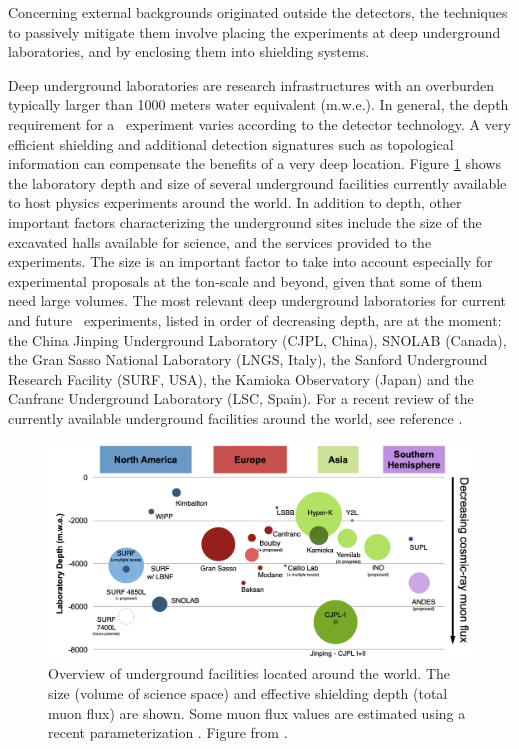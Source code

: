 Concerning external backgrounds originated outside the detectors, the techniques to passively mitigate them involve placing the experiments at deep underground laboratories, and by enclosing them into shielding systems. 

Deep underground laboratories are research infrastructures with an overburden typically larger than 1000 meters water equivalent (m.w.e.). In general, the depth requirement for a \bbonu\ experiment varies according to the detector technology. A very efficient shielding and additional detection signatures such as topological information can compensate the benefits of a very deep location. Figure \ref{fig:underground_facilities} shows the laboratory depth and size of several underground facilities currently available to host physics experiments around the world. In addition to depth, other important factors characterizing the underground sites include the size of the excavated halls available for science, and the services provided to the experiments. The size is an important factor to take into account especially for experimental proposals at the ton-scale and beyond, given that some of them need large volumes. The most relevant deep underground laboratories for current and future \bbonu\ experiments, listed in order of decreasing depth, are at the moment: the China Jinping Underground Laboratory (CJPL, China), SNOLAB (Canada), the Gran Sasso National Laboratory (LNGS, Italy), the Sanford Underground Research Facility (SURF, USA), the Kamioka Observatory (Japan) and the Canfranc Underground Laboratory (LSC, Spain). For a recent review of the currently available underground facilities around the world, see reference \cite{Ianni:2023fvs}. 

\begin{figure}[t!b!]
\begin{center}
\includegraphics[width=\textwidth]{img/UndergroundFacilities.png}
\caption{\label{fig:underground_facilities}Overview of underground facilities located around the world. The size (volume of science space) and effective shielding depth (total muon flux) are shown. Some muon flux values are estimated using a recent parameterization \cite{JNE:2020bwn}. Figure from \cite{Baudis:2022pzb,Heise:2022iaf}.}
\end{center}
\end{figure}

